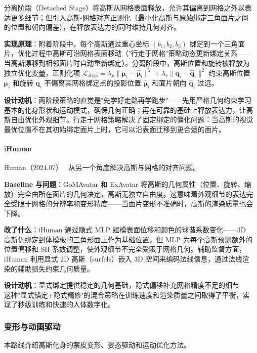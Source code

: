 分离阶段（Detached Stage）将高斯从网格表面释放，允许其偏离到网格之外以表达更多细节；但引入高斯-网格对齐正则化（最小化高斯与原始绑定三角面片之间的位置和朝向偏差），在释放表达力的同时维持几何对齐。

\textbf{实现原理}：附着阶段中，每个高斯通过重心坐标 $(b_1, b_2, b_3)$ 绑定到一个三角面片，优化过程中高斯可沿网格表面移动（"行走于网格"策略动态更新绑定关系——当高斯漂移到相邻面片时自动重新绑定）。分离阶段中，高斯位置和旋转被释放为独立优化变量，正则化项 $\mathcal{L}_{\text{align}} = \lambda_p \|\boldsymbol{\mu}_i - \hat{\boldsymbol{\mu}}_i\|^2 + \lambda_r \|\boldsymbol{q}_i - \hat{\boldsymbol{q}}_i\|^2$ 约束高斯位置 $\boldsymbol{\mu}_i$ 和旋转 $\boldsymbol{q}_i$ 不偏离其网格绑定点的投影位置 $\hat{\boldsymbol{\mu}}_i$ 和面片朝向 $\hat{\boldsymbol{q}}_i$ 过远。

\textbf{设计动机}：两阶段策略的直觉是"先学好走路再学跑步"——先用严格几何约束学习基本的化身形状和运动模式，确保几何正确；再在可靠的基础上释放表达力，让高斯自由优化外观细节。行走于网格策略解决了固定绑定的僵化问题：当高斯的视觉最优位置不在其初始绑定面片上时，它可以沿表面迁移到更合适的面片。

\paragraph{iHuman}

Human（2024.07）~\cite{2407_11174} 从另一个角度解决高斯与网格的对齐问题。

\textbf{Baseline 与问题}：GoMAvatar 和 ExAvatar 将高斯的几何属性（位置、旋转、缩放）完全由所在面片的几何决定，高斯无独立自由度。这意味着外观细节的表达完全受限于网格的分辨率和变形精度——当面片变形不准确时，高斯的渲染质量也会下降。

\textbf{改了什么}：iHuman 通过隐式 MLP 建模表面位移和颜色的球谐系数变化——3D 高斯仍绑定到体模板的三角形面上作为基础位置，但 MLP 为每个高斯预测额外的位置偏移和 SH 系数调整，使外观细节不完全受限于网格几何。辅助监督方面，iHuman 利用显式 2D 高斯（surfels）嵌入 3D 空间来编码法线信息，通过法线渲染的辅助损失约束几何质量。

\textbf{设计动机}：显式绑定提供稳定的几何基础，隐式偏移补充网格精度不足的细节——这种"显式锚定+隐式精修"的混合策略在训练速度和渲染质量之间取得了平衡，实现了秒级训练和快速的人体数字化。

\subsubsection{变形与动画驱动}

本路线介绍高斯化身的蒙皮变形、姿态驱动和运动优化方法。

